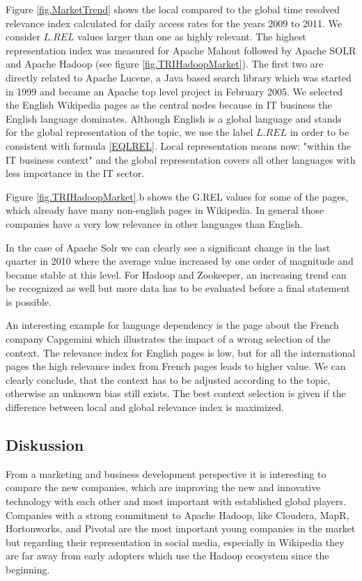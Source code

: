 \documentclass[a4paper,10pt]{scrbook}
\begin{document}
\label{ext.fig.GoogleTrends4}


Figure \ref{fig.MarketTrend} shows the local compared to the global time resolved relevance index calculated for daily access rates for the years 2009 to 2011. We consider $L.REL$ values larger than one as highly relevant. The highest representation index was measured for Apache Mahout followed by Apache SOLR and Apache Hadoop (see figure \ref{fig.TRIHadoopMarket}). The first two are directly related to Apache Lucene, a Java based search library which was started in 1999 and became an Apache top level project in February 2005. We selected the English Wikipedia pages as the central nodes because in IT business the English language dominates. Although English is a global language and stands for the global representation of the topic, we use the label $L.REL$ in order to be consistent with formula \ref{EQLREL}. Local representation means now: "within the IT business context" and the global representation covers all other languages with less importance in the IT sector.

\label{ext.fig.TRIHadoopMarket} 


Figure \ref{fig.TRIHadoopMarket}.b shows the G.REL values for some of the pages, which already have many non-english pages in Wikipedia. In general those companies have a very low relevance in other languages than English.  

In the case of Apache Solr we can clearly see a significant change in the last quarter in 2010 where the average value increased by one order of magnitude and became stable at this level. For Hadoop and Zookeeper, an increasing trend can be recognized as well but more data has to be evaluated before a final statement is possible.

An interesting example for language dependency is the page about the French company Capgemini which illustrates the impact of a wrong selection of the context. The relevance index for English pages is low, but for all the international pages the high relevance index from French pages leads to higher value. We can clearly conclude, that the context has to be adjusted according to the topic, otherwise an unknown bias still exists. The best context selection is given if the difference between local and global relevance index is maximized.
\clearpage
\subsection{Diskussion}
From a marketing and business development perspective it is interesting to compare the new companies, which are improving the new and innovative technology with each other and most important with established global players. Companies with a strong commitment to Apache Hadoop, like Cloudera, MapR, Hortonworks, and Pivotal are the most important young companies in the market but regarding their representation in social media, especially in Wikipedia they are far away from early adopters which use the Hadoop ecosystem since the beginning. 
\end{document}
